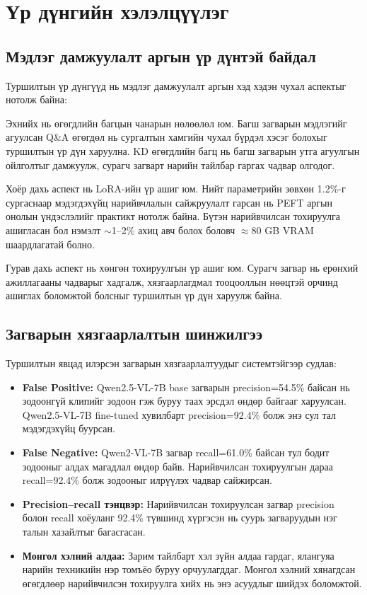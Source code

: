 \section{Үр дүнгийн хэлэлцүүлэг}

\subsection{Мэдлэг дамжуулалт аргын үр дүнтэй байдал}

Туршилтын үр дүнгүүд нь мэдлэг дамжуулалт аргын хэд хэдэн чухал аспектыг нотолж байна:

Эхнийх нь өгөгдлийн багцын чанарын нөлөөлөл юм. Багш загварын мэдлэгийг агуулсан Q\&A өгөгдөл нь сургалтын хамгийн чухал бүрдэл хэсэг болохыг туршилтын үр дүн харуулна. KD өгөгдлийн багц нь багш загварын утга агуулгын ойлголтыг дамжуулж, сурагч загварт нарийн тайлбар гаргах чадвар олгодог.

Хоёр дахь аспект нь LoRA-ийн үр ашиг юм. Нийт параметрийн зөвхөн 1.2\%-г сургаснаар мэдэгдэхүйц нарийвчлалын сайжруулалт гарсан нь PEFT аргын онолын үндэслэлийг практикт нотолж байна. Бүтэн нарийвчилсан тохируулга ашигласан бол нэмэлт $\sim$1--2\% ахиц авч болох боловч $\approx$80 GB VRAM шаардлагатай болно.

Гурав дахь аспект нь хөнгөн тохируулгын үр ашиг юм. Сурагч загвар нь ерөнхий ажиллагааны чадварыг хадгалж, хязгаарлагдмал тооцооллын нөөцтэй орчинд ашиглах боломжтой болсныг туршилтын үр дүн харуулж байна.

\subsection{Загварын хязгаарлалтын шинжилгээ}

Туршилтын явцад илэрсэн загварын хязгаарлалтуудыг системтэйгээр судлав:

\begin{itemize}
    \item \textbf{False Positive:} Qwen2.5-VL-7B base загварын precision=54.5\% байсан нь зодоонгүй клипийг зодоон гэж буруу таах эрсдэл өндөр байгааг харуулсан. Qwen2.5-VL-7B fine-tuned хувилбарт precision=92.4\% болж энэ сул тал мэдэгдэхүйц буурсан.

    \item \textbf{False Negative:} Qwen2-VL-7B загвар recall=61.0\% байсан тул бодит зодооныг алдах магадлал өндөр байв. Нарийвчилсан тохируулгын дараа recall=92.4\% болж зодооныг илрүүлэх чадвар сайжирсан.

    \item \textbf{Precision--recall тэнцвэр:} Нарийвчилсан тохируулсан загвар precision болон recall хоёуланг 92.4\% түвшинд хүргэсэн нь суурь загваруудын нэг талын хазайлтыг багасгасан.

    \item \textbf{Монгол хэлний алдаа:} Зарим тайлбарт хэл зүйн алдаа гардаг, ялангуяа нарийн техникийн нэр томъёо буруу орчуулагддаг. Монгол хэлний хянагдсан өгөгдлөөр нарийвчилсэн тохируулга хийх нь энэ асуудлыг шийдэх боломжтой.
\end{itemize}
